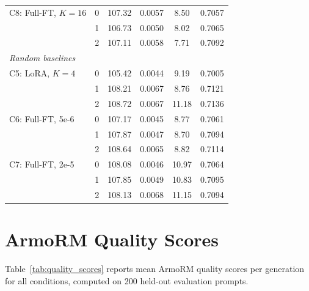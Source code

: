 \begin{table}[t]
\begin{tabular}{@{}llcccc@{}}
C8: Full-FT, $K{=}16$
  & 0 & 107.32 & 0.0057 &  8.50 & 0.7057 \\
  & 1 & 106.73 & 0.0050 &  8.02 & 0.7065 \\
  & 2 & 107.11 & 0.0058 &  7.71 & 0.7092 \\
\midrule
\multicolumn{6}{l}{\textit{Random baselines}} \\
\midrule
C5: LoRA, $K{=}4$
  & 0 & 105.42 & 0.0044 &  9.19 & 0.7005 \\
  & 1 & 108.21 & 0.0067 &  8.76 & 0.7121 \\
  & 2 & 108.72 & 0.0067 & 11.18 & 0.7136 \\
\midrule
C6: Full-FT, 5e-6
  & 0 & 107.17 & 0.0045 &  8.77 & 0.7061 \\
  & 1 & 107.87 & 0.0047 &  8.70 & 0.7094 \\
  & 2 & 108.64 & 0.0065 &  8.82 & 0.7114 \\
\midrule
C7: Full-FT, 2e-5
  & 0 & 108.08 & 0.0046 & 10.97 & 0.7064 \\
  & 1 & 107.85 & 0.0049 & 10.83 & 0.7095 \\
  & 2 & 108.13 & 0.0068 & 11.15 & 0.7094 \\
\bottomrule
\end{tabular}
\end{table}

\section{ArmoRM Quality Scores}
\label{app:quality_scores}

Table~\ref{tab:quality_scores} reports mean ArmoRM quality scores per generation for all conditions, computed on 200 held-out evaluation prompts.

